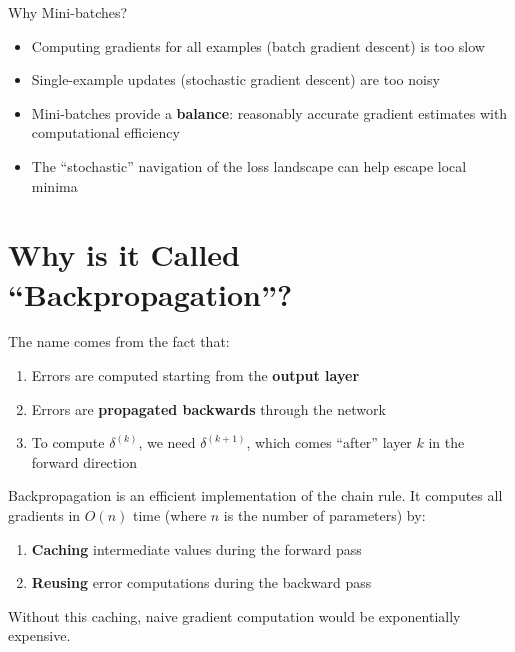 \begin{infobox}{Why Mini-batches?}
\begin{itemize}
    \item Computing gradients for all examples (batch gradient descent) is too slow
    \item Single-example updates (stochastic gradient descent) are too noisy
    \item Mini-batches provide a \textbf{balance}: reasonably accurate gradient estimates with computational efficiency
    \item The ``stochastic'' navigation of the loss landscape can help escape local minima
\end{itemize}
\end{infobox}

\section{Why is it Called ``Backpropagation''?}

The name comes from the fact that:
\begin{enumerate}
    \item Errors are computed starting from the \textbf{output layer}
    \item Errors are \textbf{propagated backwards} through the network
    \item To compute $\delta^{(k)}$, we need $\delta^{(k+1)}$, which comes ``after'' layer $k$ in the forward direction
\end{enumerate}

\begin{keyconcept}
Backpropagation is an efficient implementation of the chain rule. It computes all gradients in $O(n)$ time (where $n$ is the number of parameters) by:
\begin{enumerate}
    \item \textbf{Caching} intermediate values during the forward pass
    \item \textbf{Reusing} error computations during the backward pass
\end{enumerate}
Without this caching, naive gradient computation would be exponentially expensive.
\end{keyconcept}

